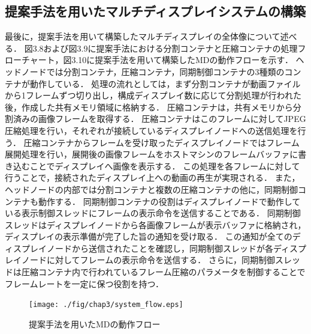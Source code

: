 \subsection*{提案手法を用いたマルチディスプレイシステムの構築}
最後に，提案手法を用いて構築したマルチディスプレイの全体像について述べる．
図3.8および図3.9に提案手法における分割コンテナと圧縮コンテナの処理フローチャート，図3.10に提案手法を用いて構築したMDの動作フローを示す．
ヘッドノードでは分割コンテナ，圧縮コンテナ，同期制御コンテナの3種類のコンテナが動作している．
処理の流れとしては，まず分割コンテナが動画ファイルから1フレームずつ切り出し，構成ディスプレイ数に応じて分割処理が行われた後，作成した共有メモリ領域に格納する．
圧縮コンテナは，共有メモリから分割済みの画像フレームを取得する．
圧縮コンテナはこのフレームに対してJPEG圧縮処理を行い，それぞれが接続しているディスプレイノードへの送信処理を行う．
圧縮コンテナからフレームを受け取ったディスプレイノードではフレーム展開処理を行い，展開後の画像フレームをホストマシンのフレームバッファに書き込むことでディスプレイへ画像を表示する．
この処理を各フレームに対して行うことで，接続されたディスプレイ上への動画の再生が実現される．
また，ヘッドノードの内部では分割コンテナと複数の圧縮コンテナの他に，同期制御コンテナも動作する．
同期制御コンテナの役割はディスプレイノードで動作している表示制御スレッドにフレームの表示命令を送信することである．
同期制御スレッドはディスプレイノードから各画像フレームが表示バッファに格納され，ディスプレイの表示準備が完了した旨の通知を受け取る．
この通知が全てのディスプレイノードから送信されたことを確認し，同期制御スレッドが各ディスプレイノードに対してフレームの表示命令を送信する．
さらに，同期制御スレッドは圧縮コンテナ内で行われているフレーム圧縮のパラメータを制御することでフレームレートを一定に保つ役割を持つ．


\begin{figure}[H]
    \hspace*{\fill}
    \texttt{[image: ./fig/chap3/system\_flow.eps]}
    \hspace*{\fill}
    \caption{提案手法を用いたMDの動作フロー}
\end{figure}
